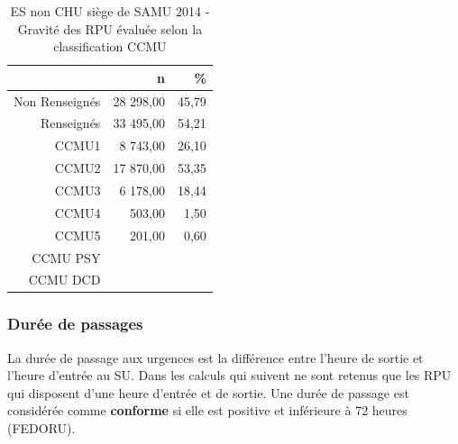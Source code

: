 \documentclass[]{article}
\begin{document}
\begin{itemize}
  \begin{table}[ht]
  \centering
  \begin{tabular}{rrr}
    \hline
   & n & \% \\ 
    \hline
  Non Renseignés & 28 298,00 & 45,79 \\ 
    Renseignés & 33 495,00 & 54,21 \\ 
    CCMU1 & 8 743,00 & 26,10 \\ 
    CCMU2 & 17 870,00 & 53,35 \\ 
    CCMU3 & 6 178,00 & 18,44 \\ 
    CCMU4 & 503,00 & 1,50 \\ 
    CCMU5 & 201,00 & 0,60 \\ 
    CCMU PSY &  &  \\ 
    CCMU DCD &  &  \\ 
     \hline
  \end{tabular}
  \caption{ES non CHU siège de SAMU 2014 - Gravité des RPU évaluée selon la classification CCMU} 
  \end{table}
\end{itemize}

\subsubsection{Durée de passages}\label{duree-de-passages-1}

La durée de passage aux urgences est la différence entre l'heure de
sortie et l'heure d'entrée au SU. Dans les calculs qui suivent ne sont
retenus que les RPU qui disposent d'une heure d'entrée et de sortie. Une
durée de passage est considérée comme \textbf{conforme} si elle est
positive et inférieure à 72 heures (FEDORU).
\end{document}
